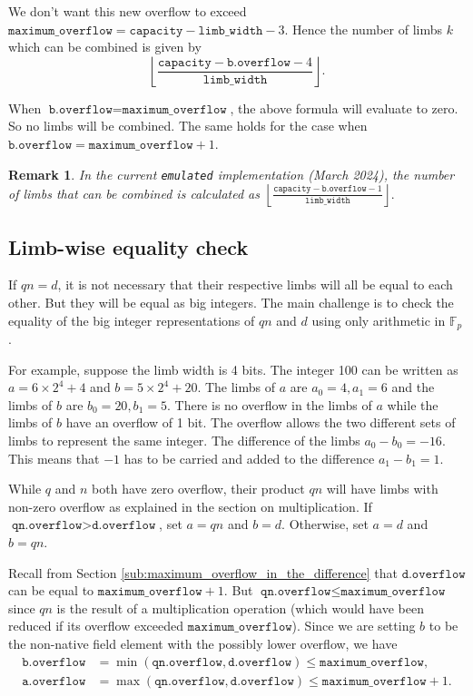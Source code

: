 \documentclass[a4paper, 12pt]{article}
\newtheorem*{remark}{Remark}
\begin{document}
We don't want this new overflow to exceed $\texttt{maximum\_overflow} = \texttt{capacity} - \texttt{limb\_width} - 3$.
Hence the number of limbs $k$ which can be combined is given by
$$
\left\lfloor \frac{\texttt{capacity}-\texttt{b.overflow}-4}{\texttt{limb\_width}}\right\rfloor.
$$

When $\texttt{b.overflow} = \texttt{maximum\_overflow}$, the above formula will evaluate to zero. So no limbs will be combined. The same holds for the case when $\texttt{b.overflow} = \texttt{maximum\_overflow} + 1$.

\begin{remark}
In the current \texttt{emulated} implementation (March 2024), the number of limbs that can be combined is calculated as $
\left\lfloor \frac{\texttt{capacity}-\texttt{b.overflow}-1}{\texttt{limb\_width}}\right\rfloor.$
\end{remark}

\subsection{Limb-wise equality check}%
\label{sub:limb_wise_equality_check}

If $qn = d$, it is not necessary that their respective limbs will all be equal to each other. But they will be equal as big integers. 
 The main challenge is to check the equality of the big integer representations of $qn$ and $d$ using only arithmetic in $\mathbb{F}_p$.

For example, suppose the limb width is 4 bits. The integer 100 can be written as $a = 6 \times 2^4 + 4$ and $b = 5 \times 2^4  +20$. The limbs of $a$ are $a_0=4, a_1=6$ and the limbs of $b$ are $b_0 = 20, b_1 =5$. There is no overflow in the limbs of $a$ while the limbs of $b$ have an overflow of 1 bit. The overflow allows the two different sets of limbs to represent the same integer. The difference of the limbs $a_0 - b_0 = -16$. This means that $-1$ has to be carried and added to the difference $a_1 - b_1 = 1$.


While $q$ and $n$ both have zero overflow, their product $qn$ will have limbs with non-zero overflow as explained in the section on multiplication. If $\texttt{qn.overflow} > \texttt{d.overflow}$, set $a = qn$ and $b = d$. Otherwise, set $a = d$ and $b = qn$.

Recall from Section \ref{sub:maximum_overflow_in_the_difference} that $\texttt{d.overflow}$ can be equal to $\texttt{maximum\_overflow} + 1$. But $\texttt{qn.overflow} \le \texttt{maximum\_overflow}$ since $qn$ is the result of a multiplication operation (which would have been reduced if its overflow exceeded $\texttt{maximum\_overflow}$). Since we are setting $b$ to be the non-native field element with the possibly lower overflow, we have
\begin{align*}
  \texttt{b.overflow} & = \min(\texttt{qn.overflow}, \texttt{d.overflow}) \le \texttt{maximum\_overflow}, \\
\texttt{a.overflow} & = \max(\texttt{qn.overflow}, \texttt{d.overflow}) \le \texttt{maximum\_overflow} + 1.
\end{align*}
\end{document}
